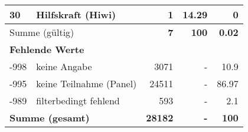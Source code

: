 \begin{longtable}{lXrrr}
     30 &
     \multicolumn{1}{X}{ Hilfskraft (Hiwi)   } &


       \num{1} &
       \num[round-mode=places,round-precision=2]{14,29} &
         \num[round-mode=places,round-precision=2]{0} \\
     \midrule
     \multicolumn{2}{l}{Summe (gültig)} &
       \textbf{\num{7}} &
     \textbf{100} &
       \textbf{\num[round-mode=places,round-precision=2]{0,02}} \\
     \multicolumn{5}{l}{\textbf{Fehlende Werte}}\\
       -998 &
       keine Angabe &
         \num{3071} &
        - &
         \num[round-mode=places,round-precision=2]{10,9} \\
       -995 &
       keine Teilnahme (Panel) &
         \num{24511} &
        - &
         \num[round-mode=places,round-precision=2]{86,97} \\
       -989 &
       filterbedingt fehlend &
         \num{593} &
        - &
         \num[round-mode=places,round-precision=2]{2,1} \\
     \midrule
     \multicolumn{2}{l}{\textbf{Summe (gesamt)}} &
          \textbf{\num{28182}} &
        \textbf{-} &
        \textbf{100} \\
     \bottomrule
     \end{longtable}
     
